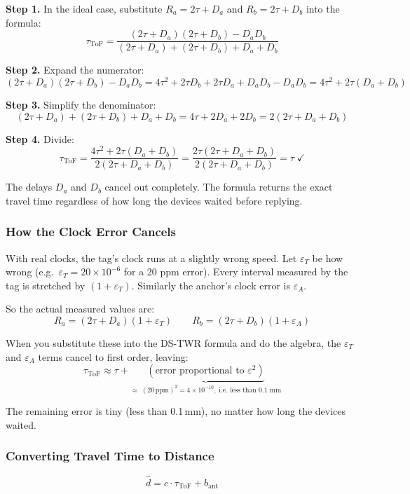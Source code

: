 \documentclass[11pt,a4paper]{article}
\begin{document}
\textbf{Step 1.} In the ideal case, substitute $R_a = 2\tau + D_a$ and $R_b = 2\tau + D_b$ into the formula:
\[
\tau_{\text{ToF}} = \frac{(2\tau + D_a)(2\tau + D_b) - D_a D_b}{(2\tau+D_a)+(2\tau+D_b)+D_a+D_b}
\]

\textbf{Step 2.} Expand the numerator:
\[
(2\tau+D_a)(2\tau+D_b) - D_a D_b
= 4\tau^2 + 2\tau D_b + 2\tau D_a + D_a D_b - D_a D_b
= 4\tau^2 + 2\tau(D_a + D_b)
\]

\textbf{Step 3.} Simplify the denominator:
\[
(2\tau+D_a)+(2\tau+D_b)+D_a+D_b = 4\tau + 2D_a + 2D_b = 2(2\tau + D_a + D_b)
\]

\textbf{Step 4.} Divide:
\[
\tau_{\text{ToF}} = \frac{4\tau^2 + 2\tau(D_a+D_b)}{2(2\tau+D_a+D_b)}
= \frac{2\tau(2\tau+D_a+D_b)}{2(2\tau+D_a+D_b)} = \tau \;\checkmark
\]

The delays $D_a$ and $D_b$ cancel out completely. The formula returns the exact travel time regardless of how long the devices waited before replying.

\subsubsection{How the Clock Error Cancels}

With real clocks, the tag's clock runs at a slightly wrong speed. Let $\varepsilon_T$ be how wrong (e.g.\ $\varepsilon_T = 20 \times 10^{-6}$ for a 20 ppm error). Every interval measured by the tag is stretched by $(1 + \varepsilon_T)$. Similarly the anchor's clock error is $\varepsilon_A$.

So the actual measured values are:
\[
R_a = (2\tau + D_a)(1 + \varepsilon_T) \qquad R_b = (2\tau + D_b)(1 + \varepsilon_A)
\]

When you substitute these into the DS-TWR formula and do the algebra, the $\varepsilon_T$ and $\varepsilon_A$ terms cancel to first order, leaving:
\[
\tau_{\text{ToF}} \approx \tau + \underbrace{(\text{error proportional to } \varepsilon^2)}_{\approx\;(20\,\text{ppm})^2 = 4\times10^{-10},\;\text{i.e.\ less than 0.1 mm}}
\]

The remaining error is tiny (less than 0.1\,mm), no matter how long the devices waited.

\subsubsection{Converting Travel Time to Distance}

\begin{equation}
\hat{d} = c \cdot \tau_{\text{ToF}} + b_{\text{ant}}
\label{eq:dist}
\end{equation}
\end{document}
